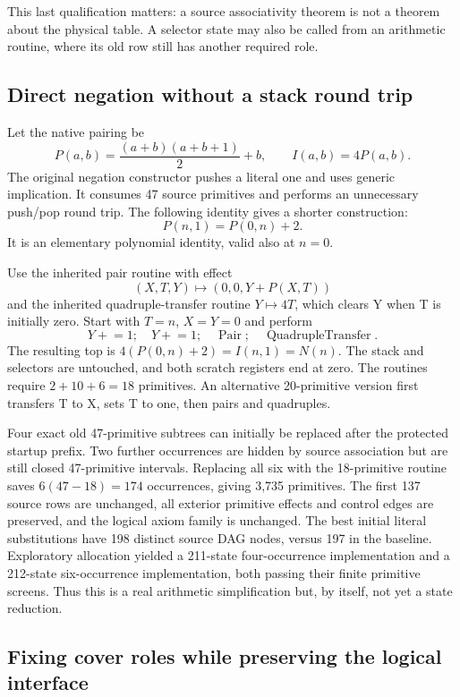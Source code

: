 \documentclass[11pt,a4paper]{article}
\begin{document}
This last qualification matters: a source associativity theorem is not a
theorem about the physical table. A selector state may also be called from
an arithmetic routine, where its old row still has another required role.

\subsection{Direct negation without a stack round trip}\label{sec:negation}

Let the native pairing be
\[
P(a,b)=\frac{(a+b)(a+b+1)}2+b,\qquad I(a,b)=4P(a,b).
\]
The original negation constructor pushes a literal one and uses generic
implication. It consumes 47 source primitives and performs an unnecessary
push/pop round trip. The following identity gives a shorter construction:
\begin{equation}\label{eq:pairidentity}
P(n,1)=P(0,n)+2.
\end{equation}
It is an elementary polynomial identity, valid also at $n=0$.

Use the inherited pair routine with effect
\[
(X,T,Y)\longmapsto (0,0,Y+P(X,T))
\]
and the inherited quadruple-transfer routine $Y\mapsto4T$, which clears Y
when T is initially zero. Start with $T=n$, $X=Y=0$ and perform
\[
Y\mathrel{+}=1;\quad Y\mathrel{+}=1;\quad
\operatorname{Pair};\quad\operatorname{QuadrupleTransfer}.
\]
The resulting top is $4(P(0,n)+2)=I(n,1)=N(n)$. The stack and selectors are
untouched, and both scratch registers end at zero. The routines require
$2+10+6=18$ primitives. An alternative 20-primitive version first transfers
T to X, sets T to one, then pairs and quadruples.

Four exact old 47-primitive subtrees can initially be replaced after the
protected startup prefix. Two further occurrences are hidden by source
association but are still closed 47-primitive intervals. Replacing all six
with the 18-primitive routine saves $6(47-18)=174$ occurrences, giving 3,735
primitives. The first 137 source rows are unchanged, all
exterior primitive effects and control edges are preserved, and the logical
axiom family is unchanged. The best initial literal substitutions have
198 distinct source DAG nodes, versus 197 in the baseline. Exploratory
allocation yielded a 211-state four-occurrence implementation and a
212-state six-occurrence implementation, both passing their finite primitive
screens. Thus this is a real arithmetic simplification but, by itself, not
yet a state reduction.

\subsection{Fixing cover roles while preserving the logical interface}
\end{document}
